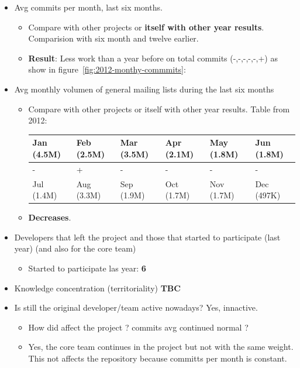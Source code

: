 \documentclass[11pt]{scrartcl}
\begin{document}
\begin{itemize}
    \item Avg commits per month, last six months.
        \begin{itemize}
            \item Compare with other projects or \textbf{itself with other year results}. Comparision with six month and twelve earlier.
            \item \textbf{Result}: Less work than a year before on total commits (-,-,-,-,-,+) as show in figure~\ref{fig:2012-monthy-commmits}:
        \end{itemize}
    \item Avg monthly volumen of general mailing lists during the last six months
    \begin{itemize}
        \item Compare with other projects or itself with other year results. Table from 2012:

            \begin{tabular}{|l|l|l|l|l|l|}
                \hline
        	    Jan (4.5M) & Feb (2.5M) & Mar (3.5M) & Apr (2.1M) & May (1.8M) & Jun (1.8M)\\
        	    \hline
        	    - & + & - & - & - & -\\
                \hline
                Jul (1.4M) & Aug (3.3M) & Sep (1.9M) & Oct (1.7M) & Nov (1.7M) & Dec (497K)\\
                \hline
            \end{tabular}
        \item \textbf{Decreases}.
    \end{itemize}
    \item Developers that left the project and those that started to participate (last year) (and also for the core team)
    \begin{itemize}
        \item Started to participate las year: \textbf{6}
    \end{itemize}
    \item Knowledge concentration (territoriality) \textbf{TBC}
    \item Is still the original developer/team active nowadays? Yes, innactive.
    \begin{itemize}
        \item How did affect the project ? commits avg continued normal ?
        \item Yes, the core team continues in the project but not with the same weight. This not affects the repository because committs per month is constant.
    \end{itemize}
\end{itemize}
\end{document}
